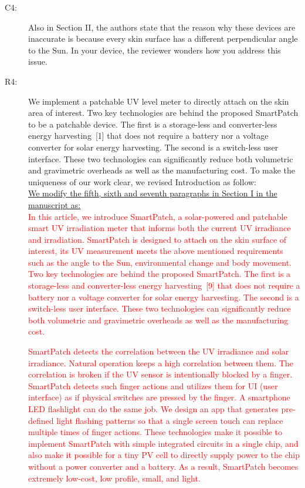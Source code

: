 \documentclass[onecolumn]{IEEEconf}
\begin{document}
\begin{description}
\item [C4: ] Also in Section II, the authors state that the reason why these devices are inaccurate is because every skin surface has a different perpendicular angle to the Sun. In your device, the reviewer wonders how you address this issue.
\item [R4: ] We implement a patchable UV level meter to directly attach on the skin area of interest. Two key technologies are behind the proposed SmartPatch to be a patchable device. The first is a storage-less and converter-less energy harvesting~[1] that does not require a battery nor a voltage converter for solar energy harvesting. The second is a switch-less user interface. These two technologies can significantly reduce both volumetric and gravimetric overheads as well as the manufacturing cost. To make the uniqueness of our work clear, we revised Introduction as follow:\\

\underline{We modify the fifth, sixth and seventh paragraphs in Section I in the manuscript as:}\\
\textcolor{red}{In this article, we introduce SmartPatch, a solar-powered and patchable smart UV irradiation meter that informs both the current UV irradiance and irradiation. SmartPatch is designed to attach on the skin surface of interest, its UV measurement meets the above mentioned requirements such as the angle to the Sun, environmental change and body movement. Two key technologies are behind the proposed SmartPatch. The first is a storage-less and converter-less energy harvesting~[9] that does not require a battery nor a voltage converter for solar energy harvesting. The second is a switch-less user interface. These two technologies can significantly reduce both volumetric and gravimetric overheads as well as the manufacturing cost.}

\textcolor{red}{SmartPatch detects the correlation between the UV irradiance and solar irradiance. Natural operation keeps a high correlation between them. The correlation is broken if the UV sensor is intentionally blocked by a finger. SmartPatch detects such finger actions and utilizes them for UI (user interface) as if physical switches are pressed by the finger. A smartphone LED flashlight can do the same job. We design an app that  generates pre-defined light flashing patterns so that a single screen touch can replace multiple times of finger actions. These technologies make it possible to implement SmartPatch with simple integrated circuits in a single chip, and also make it possible for a tiny PV cell to directly supply power to the chip without a power converter and a battery. As a result, SmartPatch becomes extremely low-cost, low profile, small, and light.}


\end{description}
\end{document}
